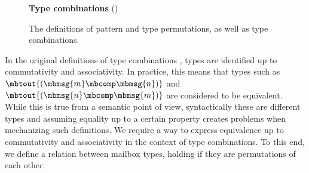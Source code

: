 \begin{figure}[t]
{  \vspace{.5cm}

  \textbf{Type combinations} () \hfill {}
  \begin{center}
    \begin{prooftree}
      \end{prooftree}
      \qquad
      \begin{prooftree}
      \end{prooftree}
      \qquad
      \begin{prooftree}
      \end{prooftree}
    \end{center}
    \begin{center}
      \begin{prooftree}
      \end{prooftree}
      \qquad
      \begin{prooftree}
      \end{prooftree}
    \end{center}
}

    \caption{The definitions of pattern and type permutations, as well as type combinations.}
    \label{fig:permutations-definition}
\end{figure}

In the original definitions of type combinations \cite{deliguoroMailboxTypesUnordered2018,fowlerSpecialDeliveryProgramming2023}, types are identified up to commutativity and associativity.
In practice, this means that types such as $\mbtout{(\mbmsg{m} \mbcomp \mbmsg{n})}$ and $\mbtout{(\mbmsg{n} \mbcomp \mbmsg{m})}$ are considered to be equivalent.
While this is true from a semantic point of view, syntactically these are different types
and assuming equality up to a certain property creates problems when mechanizing such definitions.
We require a way to express equivalence up to commutativity and associativity in
the context of type combinations.  To this end, we define a relation between
mailbox types, holding if they are permutations of each other.

